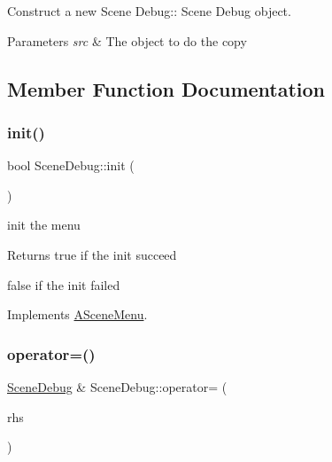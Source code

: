 Construct a new Scene Debug\+:\+: Scene Debug object. 


\begin{DoxyParams}{Parameters}
{\em src} & The object to do the copy \\
\hline
\end{DoxyParams}


\subsection{Member Function Documentation}
\mbox{\label{class_scene_debug_a4e413808e3d50dd29f9e1d07df4e6c4c}} 
\subsubsection{\texorpdfstring{init()}{init()}}
{\footnotesize\ttfamily bool Scene\+Debug\+::init (\begin{DoxyParamCaption}{ }\end{DoxyParamCaption})\hspace{0.3cm}{\ttfamily [virtual]}}



init the menu 

\begin{DoxyReturn}{Returns}
true if the init succeed 

false if the init failed 
\end{DoxyReturn}


Implements \hyperlink{class_a_scene_menu_a78bdee98bd7df224524586a060f9bdec}{A\+Scene\+Menu}.

\mbox{\label{class_scene_debug_a9b6be6294dab5d220243acd2de8763e7}} 
\subsubsection{\texorpdfstring{operator=()}{operator=()}}
{\footnotesize\ttfamily \hyperlink{class_scene_debug}{Scene\+Debug} \& Scene\+Debug\+::operator= (\begin{DoxyParamCaption}\item[{\hyperlink{class_scene_debug}{Scene\+Debug} const \&}]{rhs }\end{DoxyParamCaption})}



